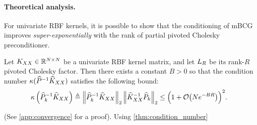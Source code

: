 
\paragraph{Theoretical analysis.}
For univariate RBF kernels, it is possible to show that the conditioning of mBCG improves \emph{super-exponentially} with the rank of partial pivoted Cholesky preconditioner.
%
\begin{lemma}
  \label{thm:condition_number}
  Let $K_{XX} \in \mathbb{R}^{N \times N}$ be a univariate RBF kernel matrix, and let $L_{R}$ be its rank-$R$ pivoted Cholesky factor.
  Then there exists a constant $B > 0$ so that the condition number $\kappa(\widehat{P}^{-1}\widehat{K}_{XX})$ satisfies the following bound:
  \begin{equation}
    \kappa \left( \trainP_{k}^{-1}\trainK \right)
    \triangleq \left\Vert \trainP_{k}^{-1}\trainK \right\Vert_{2} \left\Vert \trainK^{-1}\trainP_{k} \right\Vert_{2}
    \leq \Bigl( 1 + \bigo{N e^{-BR}} \Bigr)^2.
  \end{equation}
\end{lemma}
%
\noindent
(See \cref{app:convergence} for a proof).
Using \cref{thm:condition_number}

